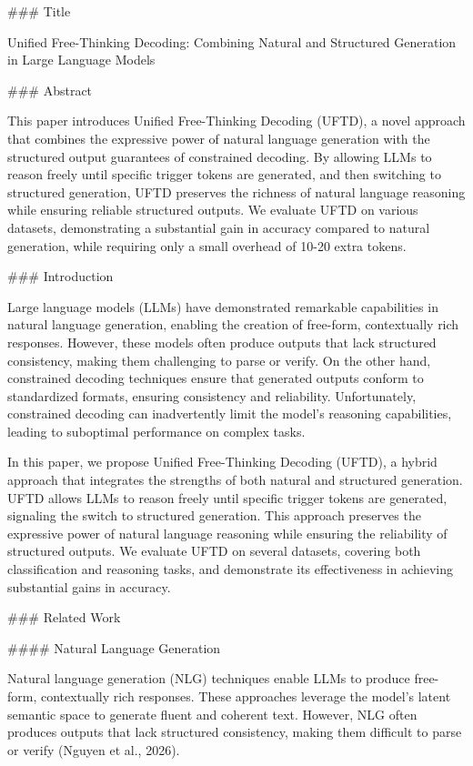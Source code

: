 ### Title

Unified Free-Thinking Decoding: Combining Natural and Structured Generation in Large Language Models

### Abstract

This paper introduces Unified Free-Thinking Decoding (UFTD), a novel approach that combines the expressive power of natural language generation with the structured output guarantees of constrained decoding. By allowing LLMs to reason freely until specific trigger tokens are generated, and then switching to structured generation, UFTD preserves the richness of natural language reasoning while ensuring reliable structured outputs. We evaluate UFTD on various datasets, demonstrating a substantial gain in accuracy compared to natural generation, while requiring only a small overhead of 10-20 extra tokens.

### Introduction

Large language models (LLMs) have demonstrated remarkable capabilities in natural language generation, enabling the creation of free-form, contextually rich responses. However, these models often produce outputs that lack structured consistency, making them challenging to parse or verify. On the other hand, constrained decoding techniques ensure that generated outputs conform to standardized formats, ensuring consistency and reliability. Unfortunately, constrained decoding can inadvertently limit the model's reasoning capabilities, leading to suboptimal performance on complex tasks.

In this paper, we propose Unified Free-Thinking Decoding (UFTD), a hybrid approach that integrates the strengths of both natural and structured generation. UFTD allows LLMs to reason freely until specific trigger tokens are generated, signaling the switch to structured generation. This approach preserves the expressive power of natural language reasoning while ensuring the reliability of structured outputs. We evaluate UFTD on several datasets, covering both classification and reasoning tasks, and demonstrate its effectiveness in achieving substantial gains in accuracy.

### Related Work

#### Natural Language Generation

Natural language generation (NLG) techniques enable LLMs to produce free-form, contextually rich responses. These approaches leverage the model’s latent semantic space to generate fluent and coherent text. However, NLG often produces outputs that lack structured consistency, making them difficult to parse or verify (Nguyen et al., 2026).

